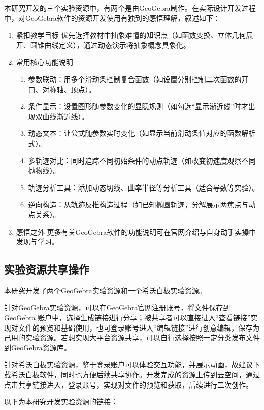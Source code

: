 本研究开发的三个实验资源中，有两个是由GeoGebra制作。在实际设计开发过程中，对GeoGebra软件的资源开发使用有独到的感悟理解，叙述如下：
\begin{enumerate}
  \item 紧扣教学目标  
  优先选择教材中抽象难懂的知识点（如函数变换、立体几何展开、圆锥曲线定义），通过动态演示将抽象概念具象化。

  \item 常用核心功能说明  
    \begin{enumerate}
      \item 参数联动：用多个滑动条控制复合函数（如设置分别控制二次函数的开口、对称轴、顶点）。
      \item 条件显示：设置图形随参数变化的显隐规则（如勾选“显示渐近线”时才出现双曲线渐近线）。
      \item 动态文本：让公式随参数实时变化（如显示当前滑动条值对应的函数解析式）。
      \item 多轨迹对比：同时追踪不同初始条件的动点轨迹（如改变初速度观察不同抛物线）。
      \item 轨迹分析工具：添加动态切线、曲率半径等分析工具（适合导数等实验）。
      \item 逆向构造：从轨迹反推构造过程（如已知椭圆轨迹，分解展示两焦点与动点关系）。
    \end{enumerate}

  \item 感悟之外  
  更多有关GeoGebra软件的功能说明可在官网介绍与自身动手实操中发现与学习。
\end{enumerate}


\subsection{实验资源共享操作}

本研究开发了两个GeoGebra实验资源和一个希沃白板实验资源。

针对GeoGebra实验资源，可以在GeoGebra官网注册账号，将文件保存到 GeoGebra 账户中，选择生成链接进行分享；被共享者可以直接进入“查看链接”实现对文件的预览和基础使用，也可登录账号进入“编辑链接”进行创意编辑，保存为己用的实验资源。若想实现大平台资源共享，可以自行选择按照一定分类发布文件到GeoGebra资源库。

针对希沃白板实验资源，鉴于登录账户可以体验交互功能，并展示动画，故建议下载希沃白板软件，同时也方便后续共享协作。开发完成的资源上传到云空间，通过点击共享链接进入，登录账号，实现对文件的预览和获取，后续进行二次创作。

以下为本研究开发实验资源的链接：

